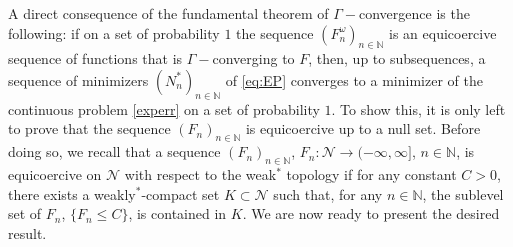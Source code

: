 \documentclass[onefignum,onetabnum]{siamonline250211}
\newcommand{\N}{\mathcal{N}}
\begin{document}
A direct consequence of the fundamental theorem of $\Gamma-$convergence \cite[Theorem 2.1]{braides} is the following: if on a set of probability $1$ the sequence $(F_n^\omega)_{n\in\mathbb{N}}$ is an equicoercive sequence of functions that is $\Gamma-$converging to $F$, then, up to subsequences, a sequence of minimizers $(N_n^*)_{n\in\mathbb{N}}$ of \cref{eq:EP} converges to a minimizer of the continuous problem \cref{experr} on a set of probability $1$. To show this, it is only left to prove that the sequence $(F_n)_{n\in\mathbb{N}}$ is equicoercive up to a null set. Before doing so, we recall that a sequence $(F_n)_{n\in\mathbb{N}}$, $F_n\colon \N\to (-\infty, \infty]$, $n\in\mathbb{N}$, is equicoercive on $\N$ with respect to the weak$^*$ topology if for any constant $C>0$, there exists a weakly$^*$-compact set $K\subset \N$ such that, for any $n\in\mathbb{N}$, the sublevel set of $F_n$, $\{F_n\leq C\}$, is contained in $K$. We are now ready to present the desired result.
\end{document}
